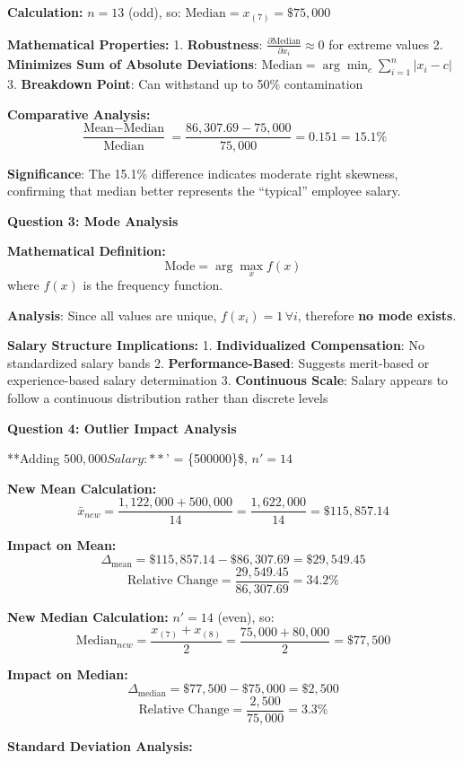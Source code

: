 \documentclass[11pt]{article}
\begin{document}
\textbf{Calculation:} \(n = 13\) (odd), so:
\(\text{Median} = x_{(7)} = \$75,000\)

\textbf{Mathematical Properties:} 1. \textbf{Robustness}:
\(\frac{\partial \text{Median}}{\partial x_i} \approx 0\) for extreme
values 2. \textbf{Minimizes Sum of Absolute Deviations}:
\(\text{Median} = \arg\min_c \sum_{i=1}^{n}|x_i - c|\) 3.
\textbf{Breakdown Point}: Can withstand up to 50\% contamination

\textbf{Comparative Analysis:}
\[\frac{\text{Mean} - \text{Median}}{\text{Median}} = \frac{86,307.69 - 75,000}{75,000} = 0.151 = 15.1\%\]

\textbf{Significance}: The 15.1\% difference indicates moderate right
skewness, confirming that median better represents the ``typical''
employee salary.

\textbf{Question 3: Mode Analysis}

\textbf{Mathematical Definition:} \[\text{Mode} = \arg\max_{x} f(x)\]
where \(f(x)\) is the frequency function.

\textbf{Analysis}: Since all values are unique,
\(f(x_i) = 1 \, \forall i\), therefore \textbf{no mode exists}.

\textbf{Salary Structure Implications:} 1. \textbf{Individualized
Compensation}: No standardized salary bands 2.
\textbf{Performance-Based}: Suggests merit-based or experience-based
salary determination 3. \textbf{Continuous Scale}: Salary appears to
follow a continuous distribution rather than discrete levels

\textbf{Question 4: Outlier Impact Analysis}

**Adding \(500,000 Salary:**\)' = 
\cup \{500000\}\$, \(n' = 14\)

\textbf{New Mean Calculation:}
\[\bar{x}_{new} = \frac{1,122,000 + 500,000}{14} = \frac{1,622,000}{14} = \$115,857.14\]

\textbf{Impact on Mean:}
\[\Delta_{\text{mean}} = \$115,857.14 - \$86,307.69 = \$29,549.45\]
\[\text{Relative Change} = \frac{29,549.45}{86,307.69} = 34.2\%\]

\textbf{New Median Calculation:} \(n' = 14\) (even), so:
\[\text{Median}_{new} = \frac{x_{(7)} + x_{(8)}}{2} = \frac{75,000 + 80,000}{2} = \$77,500\]

\textbf{Impact on Median:}
\[\Delta_{\text{median}} = \$77,500 - \$75,000 = \$2,500\]
\[\text{Relative Change} = \frac{2,500}{75,000} = 3.3\%\]

\textbf{Standard Deviation Analysis:}
\end{document}
